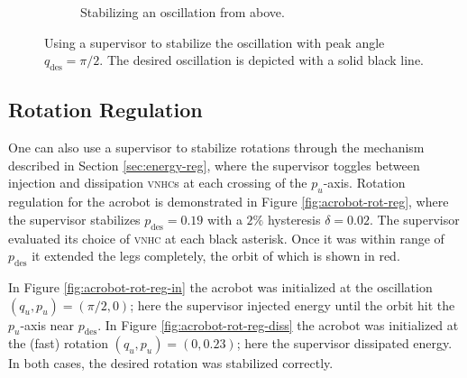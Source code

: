 \documentclass[journal,twoside,web, twocolumn,draftcls]{ieeecolor}
\newcommand*{\vnhc}{\textsc{vnhc}\xspace}
\newcommand*{\vnhcs}{\textsc{vnhc}s\xspace}
\begin{document}
\begin{figure}
\begin{subfigure}[t]{0.49\linewidth}
        \caption{Stabilizing an oscillation from above.}
        \label{fig:acrobot-osc-reg-diss}
    \end{subfigure}
    \caption{Using a supervisor to stabilize the oscillation with peak angle
    \(q_\text{des} = \pi/2\). The desired oscillation is depicted with a solid
    black line.}
    \label{fig:acrobot-osc-reg}
\end{figure}

\subsection{Rotation Regulation}
One can also use a supervisor to stabilize rotations through the mechanism
described in Section \ref{sec:energy-reg}, where the supervisor toggles between
injection and dissipation \vnhcs at each crossing of the \(p_u\)-axis.
Rotation regulation for the acrobot is demonstrated in 
Figure \ref{fig:acrobot-rot-reg}, where the supervisor stabilizes 
\(p_\text{des} = 0.19\) with a \(2\%\) hysteresis \(\delta = 0.02\).
The supervisor evaluated its choice of \vnhc at each black asterisk.
Once it was within range of \(p_\text{des}\) it extended the legs completely,
the orbit of which is shown in red.

In Figure \ref{fig:acrobot-rot-reg-in} the acrobot was initialized at 
the oscillation \((q_u,p_u) = (\pi/2,0)\); here the supervisor injected energy
until the orbit hit the \(p_u\)-axis near \(p_\text{des}\).
In Figure \ref{fig:acrobot-rot-reg-diss} the acrobot was initialized at the
(fast) rotation \((q_u,p_u) = (0, 0.23)\); here the supervisor dissipated energy.
In both cases, the desired rotation was stabilized correctly.
\end{document}
